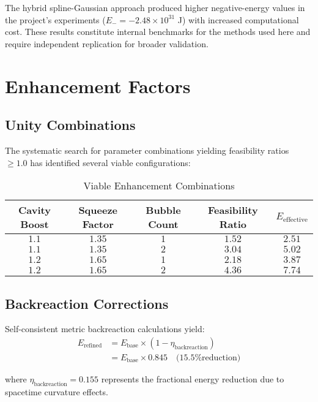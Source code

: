 \documentclass[12pt]{article}
\begin{document}
The hybrid spline-Gaussian approach produced higher negative-energy values in the project's experiments ($E_- = -2.48\times10^{31}$ J) with increased computational cost. These results constitute internal benchmarks for the methods used here and require independent replication for broader validation.

\section{Enhancement Factors}

\subsection{Unity Combinations}

The systematic search for parameter combinations yielding feasibility ratios $\geq 1.0$ has identified several viable configurations:

\begin{table}[ht]
\centering
\caption{Viable Enhancement Combinations}
\label{tab:enhancement_combinations}
\begin{tabular}{@{}ccccc@{}}
\toprule
\textbf{Cavity Boost} & \textbf{Squeeze Factor} & \textbf{Bubble Count} & \textbf{Feasibility Ratio} & \textbf{$E_{\text{effective}}$} \\
\midrule
$1.1$ & $1.35$ & $1$ & $1.52$ & $2.51$ \\
$1.1$ & $1.35$ & $2$ & $3.04$ & $5.02$ \\
$1.2$ & $1.65$ & $1$ & $2.18$ & $3.87$ \\
$1.2$ & $1.65$ & $2$ & $4.36$ & $7.74$ \\
\bottomrule
\end{tabular}
\end{table}

\subsection{Backreaction Corrections}

Self-consistent metric backreaction calculations yield:
\begin{align}
E_{\text{refined}} &= E_{\text{base}} \times (1 - \eta_{\text{backreaction}}) \\
&= E_{\text{base}} \times 0.845 \quad \text{(15.5\% reduction)}
\end{align}

where $\eta_{\text{backreaction}} = 0.155$ represents the fractional energy reduction due to spacetime curvature effects.
\end{document}
